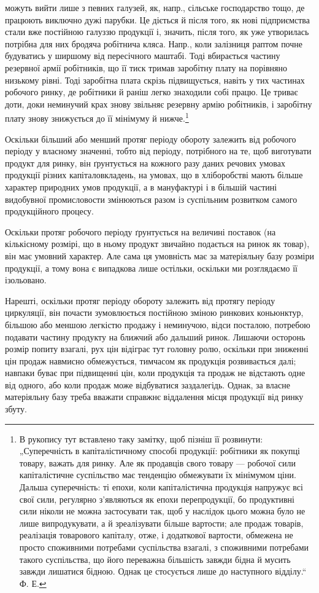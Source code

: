 \parcont{}  %
можуть вийти лише з певних галузей, як, напр., сільське господарство тощо,
де працюють виключно дужі парубки. Це діється й після того, як нові підприємства
стали вже постійною галуззю продукції і, значить, після того,
як уже утворилась потрібна для них бродяча робітнича кляса. Напр.,
коли залізниця раптом почне будуватись у ширшому від пересічного
маштабі. Тоді вбирається частину резервної армії робітників, що її тиск
тримав заробітну плату на порівняно низькому рівні. Тоді заробітна плата
скрізь підвищується, навіть у тих частинах робочого ринку, де робітники
й раніш легко знаходили собі працю. Це триває доти, доки неминучий
крах знову звільняє резервну армію робітників, і заробітну плату
знову знижується до її мінімуму й нижче.\footnote{
В рукопису тут вставлено таку замітку, щоб пізніш її розвинути: „Суперечність
в капіталістичному способі продукції: робітники як покупці товару,
важать для ринку. Але як продавців свого товару — робочої сили капіталістичне
суспільство має тенденцію обмежувати їх мінімумом ціни. Дальша суперечність:
ті епохи, коли капіталістична продукція напружує всі свої сили, регулярно з’являються
як епохи перепродукції, бо продуктивні сили ніколи не можна застосувати
так, щоб у наслідок цього можна було не лише випродукувати, а й зреалізувати
більше вартости; але продаж товарів, реалізація товарового капіталу, отже,
і додаткової вартости, обмежена не просто споживними потребами суспільства
взагалі, з споживними потребами такого суспільства, що його переважна
більшість завжди бідна й мусить завжди лишатися бідною. Однак це стосується
лише до наступного відділу.“ Ф. Е.
}

Оскільки більший або менший протяг періоду обороту залежить від
робочого періоду у власному значенні, тобто від періоду, потрібного на
те, щоб виготувати продукт для ринку, він ґрунтується на кожного
разу даних речових умовах продукції різних капіталовкладень, на
умовах, що в хліборобстві мають більше характер природних умов продукції,
а в мануфактурі і в більшій частині видобувної промисловости
змінюються разом із суспільним розвитком самого продукційного процесу.

Оскільки протяг робочого періоду ґрунтується на величині поставок
(на кількісному розмірі, що в ньому продукт звичайно подається на ринок
як товар), він має умовний характер. Але сама ця умовність має за
матеріяльну базу розміри продукції, а тому вона є випадкова лише остільки,
оскільки ми розглядаємо її ізольовано.

Нарешті, оскільки протяг періоду обороту залежить від протягу періоду
циркуляції, він почасти зумовлюється постійною зміною ринкових
коньюнктур, більшою або меншою легкістю продажу і неминучою, відси
посталою, потребою подавати частину продукту на ближчий або дальший
ринок. Лишаючи осторонь розмір попиту взагалі, рух цін відіграє
тут головну ролю, оскільки при зниженні цін продаж навмисно обмежується,
тимчасом як продукція розвивається далі; навпаки буває при
підвищенні цін, коли продукція та продаж не відстають одне від одного,
або коли продаж може відбуватися заздалегідь. Однак, за власне матеріяльну
базу треба вважати справжнє віддалення місця продукції від
ринку збуту.
